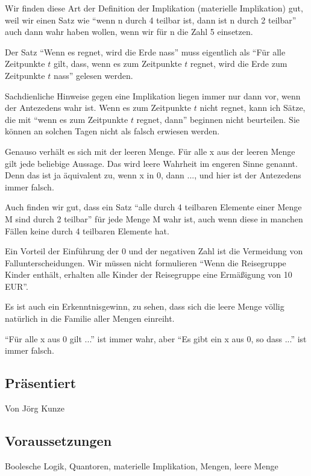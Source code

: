 \documentclass[a4paper]{amsart}
\theoremstyle{definition}
\begin{document}
Wir finden diese Art der Definition der Implikation (materielle Implikation) gut, weil wir einen Satz wie "`wenn n durch 4 teilbar ist, dann ist n durch 2 teilbar"' auch dann wahr haben wollen, wenn wir für n die Zahl 5 einsetzen.

Der Satz "`Wenn es regnet, wird die Erde nass"' muss eigentlich als "`Für alle Zeitpunkte $t$ gilt, dass, wenn es zum Zeitpunkte $t$ regnet, wird die Erde zum Zeitpunkte $t$ nass"' gelesen werden.

Sachdienliche Hinweise gegen eine Implikation liegen immer nur dann vor, wenn der Antezedens wahr ist. Wenn es zum Zeitpunkte $t$ nicht regnet, kann ich Sätze, die mit "`wenn es zum Zeitpunkte $t$ regnet, dann"' beginnen nicht beurteilen. Sie können an solchen Tagen nicht als falsch erwiesen werden.

Genauso verhält es sich mit der leeren Menge. Für alle x aus der leeren Menge gilt jede beliebige Aussage. Das wird leere Wahrheit im engeren Sinne genannt. Denn das ist ja äquivalent zu, wenn x in 0, dann ..., und hier ist der Antezedens immer falsch.

Auch finden wir gut, dass ein Satz "`alle durch 4 teilbaren Elemente einer Menge M sind durch 2 teilbar"' für jede Menge M wahr ist, auch wenn diese in manchen Fällen keine durch 4 teilbaren Elemente hat.

Ein Vorteil der Einführung der 0 und der negativen Zahl ist die Vermeidung von Fallunterscheidungen. Wir müssen nicht formulieren "`Wenn die Reisegruppe Kinder enthält, erhalten alle Kinder der Reisegruppe eine Ermäßigung von 10 EUR"'. 

Es ist auch ein Erkenntnisgewinn, zu sehen, dass sich die leere Menge völlig natürlich in die Familie aller Mengen einreiht. 

"`Für alle x aus 0 gilt ..."' ist immer wahr, aber "`Es gibt ein x aus 0, so dass ..."' ist immer falsch.

\subsection*{Präsentiert}
Von Jörg Kunze

\subsection*{Voraussetzungen}
Boolesche Logik, Quantoren, materielle Implikation, Mengen, leere Menge
\end{document}
